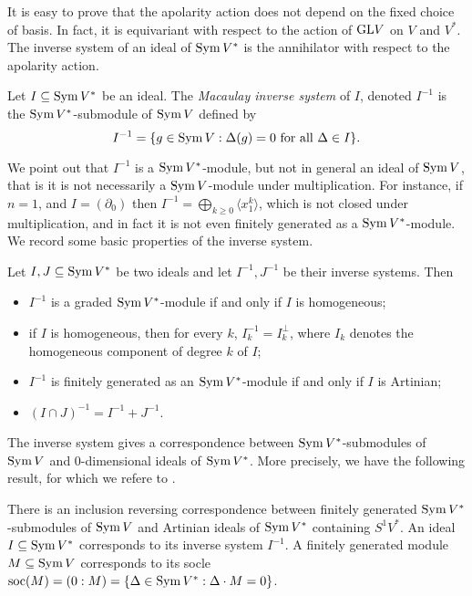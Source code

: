 It is easy to prove that the apolarity action does not depend on the fixed choice of basis. In fact, it is equivariant with respect to the action of $\mathrm{GL} V$ on $V$ and $V^*$. The inverse system of an ideal of $\operatorname{Sym} V^*$ is the annihilator with respect to the apolarity action.

\begin{definition}
 \label{apolarity-definition-inverseSystem}
 Let $I \subseteq \operatorname{Sym} V^*$ be an ideal. The {\it Macaulay inverse system} of $I$, denoted $I^{-1}$ is the $\operatorname{Sym} V^*$-submodule of $\operatorname{Sym} V$ defined by 
 \[
 I^{-1} = \{ g \in \operatorname{Sym} V : \Delta (g) = 0 \text{ for all $\Delta \in I$}\}.
 \]
\end{definition}

We point out that $ I^{-1}$ is a $\operatorname{Sym} V^*$-module, but not in general an ideal of $\operatorname{Sym} V$, that is it is not necessarily a $\operatorname{Sym} V$-module under multiplication. For instance, if $n = 1$, and $I = (\partial_0)$ then $I^{-1} = \bigoplus_{k \geq 0} \langle x_1^k \rangle$, which is not closed under multiplication, and in fact it is not even finitely generated as a $\operatorname{Sym} V^*$-module. We record some basic properties of the inverse system.

\begin{proposition}
 \label{apolarity-proposition-inverseSystemBasics}
Let $I,J \subseteq \operatorname{Sym} V^*$ be two ideals and let $I^{-1}, J^{-1}$ be their inverse systems. Then 
\begin{itemize}
 \item $I^{-1}$ is a graded $\operatorname{Sym} V^*$-module if and only if $I$ is homogeneous;
 \item if $I$ is homogeneous, then for every $k$, $I^{-1}_k = I_k^\perp$, where $I_k$ denotes the homogeneous component of degree $k$ of $I$;
 \item $I^{-1}$ is finitely generated as an $\operatorname{Sym} V^*$-module if and only if $I$ is Artinian;
 \item $(I \cap J)^{-1} = I^{-1} + J^{-1}$.
\end{itemize}
\end{proposition}

The inverse system gives a correspondence between $\operatorname{Sym} V^*$-submodules of $\operatorname{Sym} V$ and $0$-dimensional ideals of $\operatorname{Sym} V^*$. More precisely, we have the following result, for which we refere to \cite[Theorem 21.6]{Eis95}.

\begin{theorem}
 \label{apolarity-theorem-MacaulayCorrespondence}
There is an inclusion reversing correspondence between finitely generated $\operatorname{Sym} V^*$-submodules of $\operatorname{Sym} V$ and Artinian ideals of $\operatorname{Sym} V^*$ containing $S^1 V^*$. An ideal $I \subseteq \operatorname{Sym} V^*$ corresponds to its inverse system $I^{-1}$. A finitely generated module $M \subseteq \operatorname{Sym} V$ corresponds to its socle $\operatorname{soc}(M) = (0: M) = \{ \Delta \in \operatorname{Sym} V^*: \Delta \cdot M = 0\}$.
\end{theorem}

